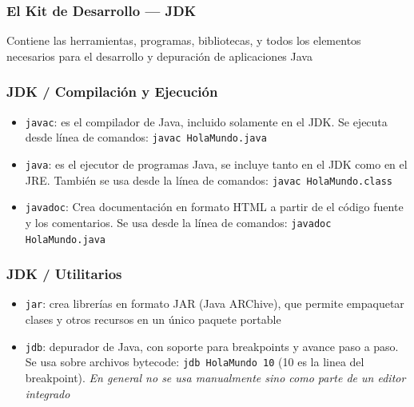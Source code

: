 \documentclass{beamer}
\begin{document}
\begin{frame}
  \frametitle{El Kit de Desarrollo --- JDK}

  \begin{exampleblock}{}
  Contiene las herramientas, programas, bibliotecas, y todos los
  elementos necesarios para el desarrollo y depuración de aplicaciones Java
  \end{exampleblock}

\end{frame}


\begin{frame}
  \frametitle{JDK / Compilación y Ejecución}  

  \begin{itemize}
    
  \item \texttt{javac}: es el compilador de Java, incluido solamente
    en el JDK. Se ejecuta desde línea de comandos: \texttt{javac HolaMundo.java}

  \item \texttt{java}: es el ejecutor de programas Java, se incluye
    tanto en el JDK como en el JRE. También se usa desde la línea de
    comandos: \texttt{javac HolaMundo.class}

  \item \texttt{javadoc}: Crea documentación en formato HTML a partir
    de el código fuente y los comentarios. Se usa desde la línea de
    comandos: \texttt{javadoc HolaMundo.java}    
    
  \end{itemize}

\end{frame}

\begin{frame}
  \frametitle{JDK / Utilitarios}

  \begin{itemize}
    
  \item \texttt{jar}: crea librerías en formato JAR (Java ARChive),
    que permite empaquetar clases y otros recursos en un único paquete
    portable

  \item \texttt{jdb}: depurador de Java, con soporte para breakpoints
    y avance paso a paso. Se usa sobre archivos bytecode: \texttt {jdb
      HolaMundo 10} (10 es la linea del breakpoint). \emph{En general
      no se usa manualmente sino como parte de un editor integrado}
        
  \end{itemize}

\end{frame}
 
\end{document}
